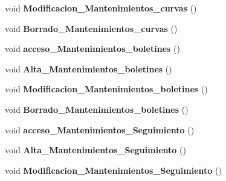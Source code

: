 \begin{DoxyCompactItemize}
\item 
void {\bfseries Modificacion\+\_\+\+Mantenimientos\+\_\+curvas} ()\hypertarget{class_sica_segura_1_1_s_i_c_a___log_a2f1b905e28a3582dc3b29a1ca01f1a53}{}\label{class_sica_segura_1_1_s_i_c_a___log_a2f1b905e28a3582dc3b29a1ca01f1a53}

\item 
void {\bfseries Borrado\+\_\+\+Mantenimientos\+\_\+curvas} ()\hypertarget{class_sica_segura_1_1_s_i_c_a___log_aa9f3a315f49bc14770f511a763fabf54}{}\label{class_sica_segura_1_1_s_i_c_a___log_aa9f3a315f49bc14770f511a763fabf54}

\item 
void {\bfseries acceso\+\_\+\+Mantenimientos\+\_\+boletines} ()\hypertarget{class_sica_segura_1_1_s_i_c_a___log_afcfe9999baebb9b53946816af08f1afa}{}\label{class_sica_segura_1_1_s_i_c_a___log_afcfe9999baebb9b53946816af08f1afa}

\item 
void {\bfseries Alta\+\_\+\+Mantenimientos\+\_\+boletines} ()\hypertarget{class_sica_segura_1_1_s_i_c_a___log_a5990e28621a5f04d0f096841f4ab5c97}{}\label{class_sica_segura_1_1_s_i_c_a___log_a5990e28621a5f04d0f096841f4ab5c97}

\item 
void {\bfseries Modificacion\+\_\+\+Mantenimientos\+\_\+boletines} ()\hypertarget{class_sica_segura_1_1_s_i_c_a___log_a6fdd9f85d55a128a40d1bed6c858b00f}{}\label{class_sica_segura_1_1_s_i_c_a___log_a6fdd9f85d55a128a40d1bed6c858b00f}

\item 
void {\bfseries Borrado\+\_\+\+Mantenimientos\+\_\+boletines} ()\hypertarget{class_sica_segura_1_1_s_i_c_a___log_a26261b89361c0459534b3fc62f7c7bed}{}\label{class_sica_segura_1_1_s_i_c_a___log_a26261b89361c0459534b3fc62f7c7bed}

\item 
void {\bfseries acceso\+\_\+\+Mantenimientos\+\_\+\+Seguimiento} ()\hypertarget{class_sica_segura_1_1_s_i_c_a___log_a980c86e2b5c4c81a67fdc635bd712c6d}{}\label{class_sica_segura_1_1_s_i_c_a___log_a980c86e2b5c4c81a67fdc635bd712c6d}

\item 
void {\bfseries Alta\+\_\+\+Mantenimientos\+\_\+\+Seguimiento} ()\hypertarget{class_sica_segura_1_1_s_i_c_a___log_adae5d9238f03469b070a99edc4c1ed40}{}\label{class_sica_segura_1_1_s_i_c_a___log_adae5d9238f03469b070a99edc4c1ed40}

\item 
void {\bfseries Modificacion\+\_\+\+Mantenimientos\+\_\+\+Seguimiento} ()\hypertarget{class_sica_segura_1_1_s_i_c_a___log_aa9adea4bd2afc0c6d21659607aced1f7}{}\label{class_sica_segura_1_1_s_i_c_a___log_aa9adea4bd2afc0c6d21659607aced1f7}


\end{DoxyCompactItemize}
